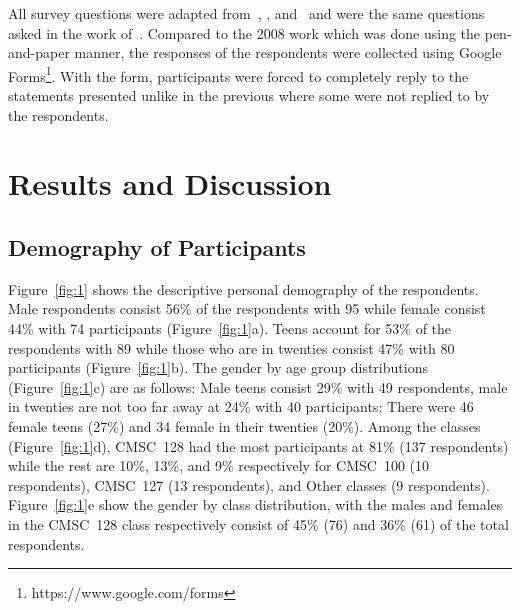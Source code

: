 \documentclass[a4paper,a4paper,BCOR12mm,12pt,abstracton,pointednumbers,tablecaptionabove,footinclude,halfparskip,normalheadings,]{scrartcl}
\begin{document}
All survey questions were adapted from~\citet{George92}, \citet{Piezon08}, and~\citet{Welbourne95} and were the same questions asked in the work of~\citet{Pabico08}. Compared to the 2008 work which was done using the pen-and-paper manner, the responses of the respondents were collected using Google Forms\footnote{https://www.google.com/forms}. With the form, participants were forced to completely reply to the statements presented unlike in the previous where some were not replied to by the respondents.

\section{Results and Discussion}\label{sec:result}

\subsection{Demography of Participants}

Figure~\ref{fig:1} shows the descriptive personal demography of the respondents. Male respondents consist 56\% of the respondents with 95 while female consist 44\% with 74 participants (Figure~\ref{fig:1}a). Teens account for 53\% of the respondents with 89 while those who are in twenties consist 47\% with 80 participants (Figure~\ref{fig:1}b). The gender by age group distributions (Figure~\ref{fig:1}c) are as follows: Male teens consist 29\% with 49 respondents, male in twenties are not too far away at 24\% with 40 participants; There were 46 female teens (27\%) and 34 female in their twenties (20\%). Among the classes (Figure~\ref{fig:1}d), CMSC~128 had the most participants at 81\% (137 respondents) while the rest are 10\%, 13\%, and 9\% respectively for CMSC~100 (10 respondents), CMSC~127 (13 respondents), and Other classes (9 respondents). Figure~\ref{fig:1}e show the gender by class distribution, with the males and females in the CMSC~128 class respectively consist of 45\% (76) and 36\% (61) of the total respondents.

\begin{figure*}[hbt]
\centering{}
\caption{The descriptive demographic distribution of the respondents according to personal data: (a)~By gender, (b)~by age group, (c)~by gender  age group, (d)~by class, and (e)~by gender  class.}\label{fig:1}
\end{figure*}
\end{document}
